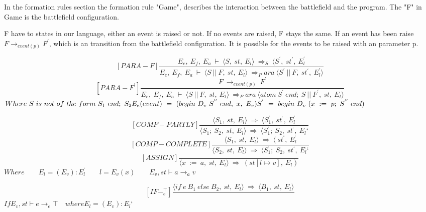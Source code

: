 In the formation rules section the formation rule "Game", describes the interaction between the battlefield and the program. The "F" in Game is the battlefield configuration. 
	
F have to states in our language, either an event is raised or not. If no events are raised, F stays the same. If an event has been raise \begin{math} F \rightarrow_{event(p)} F^{'} \end{math}, which is an transition from the battlefield configuration. It is possible for the events to be raised with an parameter p. 

	\[	
	[PARA-F]	
	\dfrac{E_e, \ E_f, \ E_a \ \vdash \ \langle S, \ st, \ E_l \rangle \ \Rightarrow_S \ \langle S^{'}, \ st^{'}, \ E_l^{'}}{E_e, \ E_f, \ E_a \ \vdash \ \langle S \ || \ F, \ st, \ E_l \rangle \ \Rightarrow_Para \ \langle S^{'} \ || \ F, \ st^{'}, \ E_l^{'} \rangle}	
	\]\newline
	\[	
	[PARA-F^{'}]	
	\dfrac{F \ \rightarrow_{event(p)} \ F^{'}}{E_e, \ E_f, \ E_a \ \vdash \ \langle S \ || \ F, \ st, \ E_l \rangle \ \Rightarrow_Para \ \langle atom \ S^{'} \ end; \ S \ || \ F^{'}, \ st, \ E_l \rangle}	
	\]
	\begin{math}		
		Where \ S \ is \ not \ of \ the \ form \ S_1 \ end; \ S_2 \newline		
		E_e(event) \ = \ (begin \ D_v \ S^{''} \ end, \ x, \ E_v) \newline		
		S^{'} \ = \ begin \ D_v \ (x \ := \ p; \ S^{''} \ end)		
	\end{math}
	
	\[
	[COMP-PARTLY]
	\dfrac{\langle S_1, \ st, \ E_l \rangle \ \Rightarrow \ \langle S_1^{‘}, \ st^{‘}, \ E_l^{‘}}{\langle S_1; \ S_2, \ st, \ E_l \rangle \ \Rightarrow \ \langle S_1^{‘}; \ S_2, \ st^{‘}, \ E_l{‘}}
	\]\newline
	\[
	[COMP-COMPLETE]
	\dfrac{\langle S_1, \ st, \ E_l \rangle \ \Rightarrow \ \langle \ st^{‘}, \ E_l^{‘}}{\langle S_2, \ st, \ E_l \rangle \ \Rightarrow \ \langle S_1^{‘}; \ S_2, \ st^{‘}, \ E_l{‘}}
	\]\newline
	\[
	[ASSIGN]
	\dfrac{}{\langle x \ := \ a, \ st, \ E_l \rangle \ \Rightarrow \ (st[l \mapsto v], \ E_l)}
	\]
	\begin{math}
		Where
		\qquad E_l = (E_v) : E_l^{‘}
		\qquad l = E_v(x)
		\qquad E_v, st \vdash a \rightarrow_a v
	\end{math}
	
	\[
	[IF-^{\top}_e]
	\dfrac{\langle if \ e \ B_1 \ else \ B_2, \ st, \ E_l \rangle \ \Rightarrow \ \langle B_1, \ st, \ E_l \rangle}{}
	\]
	\begin{math}
		If E_v, st \vdash e \rightarrow_e \top \quad where E_l = (E_v) : E_l{‘}
	\end{math}
	
